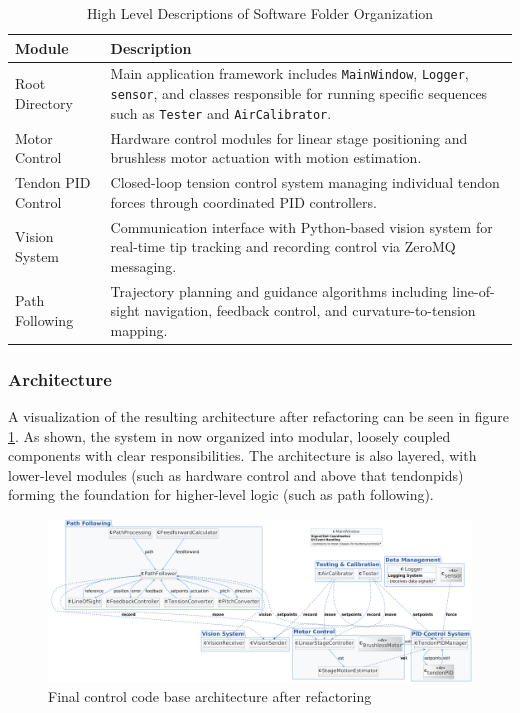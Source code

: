 \begin{table}[htbp]
\centering
\caption{High Level Descriptions of Software Folder Organization}
\begin{tabular}{p{}p{}}
\toprule
\textbf{Module} & \textbf{Description} \\
\midrule
Root Directory & Main application framework includes \texttt{MainWindow}, \texttt{Logger}, \texttt{sensor}, and classes responsible for running specific sequences such as \texttt{Tester} and \texttt{AirCalibrator}. \\
\addlinespace
Motor Control & Hardware control modules for linear stage positioning and brushless motor actuation with motion estimation. \\
\addlinespace
Tendon PID Control & Closed-loop tension control system managing individual tendon forces through coordinated PID controllers. \\
\addlinespace
Vision System & Communication interface with Python-based vision system for real-time tip tracking and recording control via ZeroMQ messaging. \\
\addlinespace
Path Following & Trajectory planning and guidance algorithms including line-of-sight navigation, feedback control, and curvature-to-tension mapping. \\
\bottomrule
\end{tabular}
\end{table}

\subsubsection{Architecture}
A visualization of the resulting architecture after refactoring can be seen in figure \ref{fig:architecture}. As shown, the system in now organized into modular, loosely coupled components with clear responsibilities. The architecture is also layered, with lower-level modules (such as hardware control and above that tendonpids) forming the foundation for higher-level logic (such as path following).

\begin{figure} [H]
	\centering
	\includegraphics[width=1.1\linewidth]{images/Software documentation/architecture3.png}
	\caption{Final control code base architecture after refactoring}
	\label{fig:architecture}
\end{figure}




